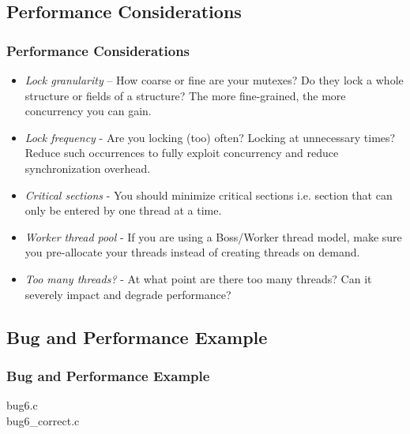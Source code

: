 \documentclass[10pt]{beamer}
\begin{document}
\subsection{Performance Considerations}  
\begin{frame}
        \frametitle{Performance Considerations}
        \begin{itemize}
            \item \emph{Lock granularity} -- How coarse or fine are your mutexes? Do they lock a whole structure or fields of a structure? The more fine-grained, the more concurrency you can gain.
            \item \emph{Lock frequency} - Are you locking (too) often? Locking at unnecessary times? Reduce such occurrences to fully exploit concurrency and reduce synchronization overhead.
            \item \emph{Critical sections} - You should minimize critical sections i.e. section that can only be entered by one thread at a time.
            \item \emph{Worker thread pool} - If you are using a Boss/Worker thread model, make sure you pre-allocate your threads instead of creating threads on demand.
            \item \emph{Too many threads?} - At what point are there too many threads? Can it severely impact and degrade performance?
        \end{itemize}
\end{frame}


\subsection{Bug and Performance Example}
\begin{frame}
    \frametitle{Bug and Performance Example}
    bug6.c \\
    bug6\_correct.c
\end{frame}
\end{document}
